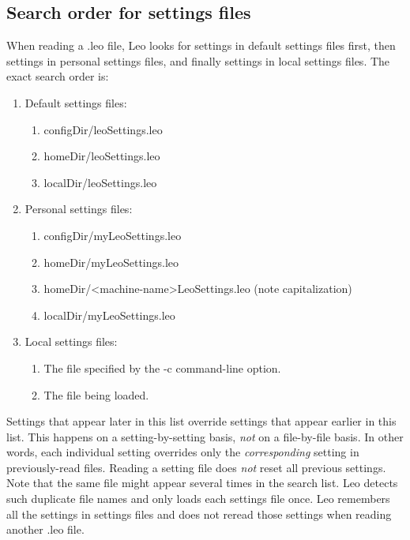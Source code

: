 \documentclass[a4paper,10pt,english]{sphinxmanual}
\begin{document}
\subsection{Search order for settings files}
\label{customizing:search-order-for-settings-files}
When reading a .leo file, Leo looks for settings in default settings
files first, then settings in personal settings files, and finally
settings in local settings files.  The exact search order is:
\begin{enumerate}
\item {} 
Default settings files:
\begin{enumerate}
\item {} 
configDir/leoSettings.leo

\item {} 
homeDir/leoSettings.leo

\item {} 
localDir/leoSettings.leo

\end{enumerate}

\item {} 
Personal settings files:
\begin{enumerate}
\item {} 
configDir/myLeoSettings.leo

\item {} 
homeDir/myLeoSettings.leo

\item {} 
homeDir/\textless{}machine-name\textgreater{}LeoSettings.leo (note capitalization)

\item {} 
localDir/myLeoSettings.leo

\end{enumerate}

\item {} 
Local settings files:
\begin{enumerate}
\item {} 
The file specified by the -c command-line option.

\item {} 
The file being loaded.

\end{enumerate}

\end{enumerate}

Settings that appear later in this list override settings that
appear earlier in this list.  This happens on a setting-by-setting
basis, \emph{not} on a file-by-file basis.  In other words, each individual
setting overrides only the \emph{corresponding} setting in previously-read
files.  Reading a setting file does \emph{not} reset all previous settings.
Note that the same file might appear several times in the search list.
Leo detects such duplicate file names and only loads each settings file once.
Leo remembers all the settings in settings files and does not reread those
settings when reading another .leo file.
\end{document}
